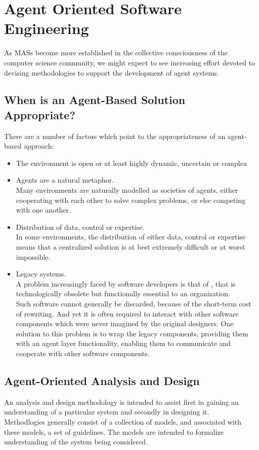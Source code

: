 \chapter{Agent Oriented Software Engineering}
\minitoc

As MASs become more established in the collective consciousness of the computer science community, we might expect to see increasing effort devoted to devising methodologies to support the development of agent systems.

\section{When is an Agent-Based Solution Appropriate?}

There are a number of factors which point to the appropriateness of an agent-based approach:
\begin{itemize}
\item The environment is open or at least highly dynamic, uncertain or complex
\item Agents are a natural metaphor.\\
Many environments are naturally modelled as societies of agents, either cooperating with each other to solve complex problems, or else competing with one another.
\item Distribution of data, control or expertise.\\
In some environments, the distribution of either data, control or expertise means that a centralized solution is at best extremely difficult or at worst impossible.
\item Legacy systems.\\
A problem increasingly faced by software developers is that of , that is technologically obsolete but functionally essential to an organization.\\
Such software cannot generally be discarded, because of the short-term cost of rewriting. And yet it is often required to interact with other software components which were never imagined by the original designers. One solution to this problem is to wrap the legacy components, providing them with an agent layer functionality, enabling them to communicate and cooperate with other software components.
\end{itemize}

\section{Agent-Oriented Analysis and Design}
An analysis and design methodology is intended to assist first in gaining an understanding of a particular system and secondly in designing it.\\
Methodlogies generally consist of a collection of models, and associated with these models, a set of guidelines. The models are intended to formalize understanding of the system being considered.

